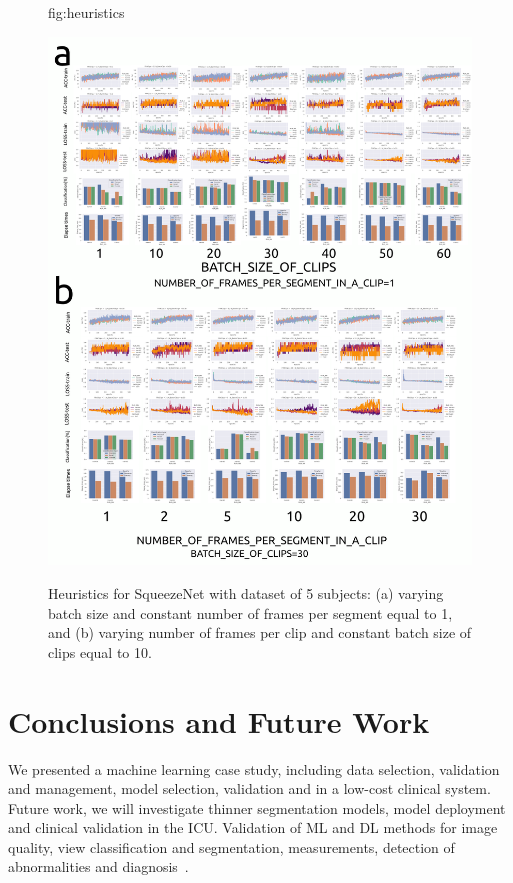 \documentclass[mlabstract,twocolumn]{jmlr}
\begin{document}
\begin{figure}[htbp]
\floatconts
  {fig:heuristics}
  {
      \caption{
          Heuristics for SqueezeNet \citep{iandola2017squeezenet} with dataset of 5 subjects:
          (a) varying batch size and constant number of frames per segment equal to 1, and
          (b) varying number of frames per clip and constant batch size of clips equal to 10.
      }
  }
  {\includegraphics[width=\columnwidth]{../figures/heuristics_results/versions/drawing-v00}}%
\end{figure}

\section{Conclusions and Future Work}
We presented a machine learning case study, including data selection, validation and management, model selection, validation and in a low-cost clinical system.
Future work, we will investigate thinner segmentation models, model deployment and clinical validation in the ICU.
Validation of ML and DL methods for image quality, view classification and segmentation, measurements, detection of abnormalities and diagnosis~\cite{2020_Kusunose_in_CurrentCardiologyReports, 2020_Kusunose_in_Biomolecules, 2021_Kusunose_in_JEchocardiography}.
\end{document}
